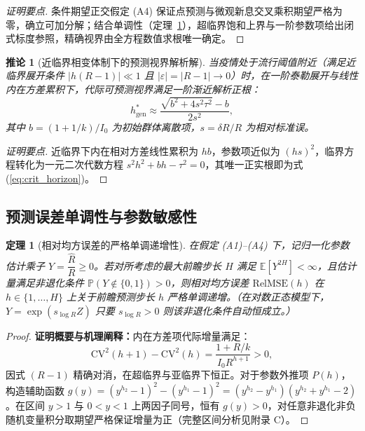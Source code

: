 \documentclass[11pt,a4paper]{article}
\theoremstyle{plain}
\newtheorem{theorem}{定理}
\newtheorem{corollary}{推论}
\theoremstyle{definition}
\begin{document}
\begin{proof}[证明要点]
条件期望正交假定 (A4) 保证点预测与微观新息交叉乘积期望严格为零，确立可加分解；结合单调性（定理~\ref{thm:monotonicity}），超临界饱和上界与一阶参数项给出闭式标度参照，精确视界由全方程数值求根唯一确定。
\end{proof}

\begin{corollary}[近临界相变体制下的预测视界解析解]\label{cor:near_crit_horizon}
当疫情处于流行阈值附近（满足近临界展开条件 $|h(R - 1)| \ll 1$ 且 $|\varepsilon| = |R - 1| \to 0$）时，在一阶泰勒展开与线性内在方差累积下，代际可预测视界满足一阶渐近解析正根：
\begin{equation}
h^*_{\text{gen}} \approx \frac{\sqrt{b^2 + 4 s^2 \tau^2} - b}{2 s^2},
\label{eq:crit_horizon}
\end{equation}
其中 $b = (1+1/k)/I_0$ 为初始群体离散项，$s = \delta R / R$ 为相对标准误。
\end{corollary}

\begin{proof}[证明要点]
近临界下内在相对方差线性累积为 $hb$，参数项近似为 $(hs)^2$，临界方程转化为一元二次代数方程 $s^2 h^2 + bh - \tau^2 = 0$，其唯一正实根即为式 (\ref{eq:crit_horizon})。
\end{proof}

\subsection{预测误差单调性与参数敏感性}

\begin{theorem}[相对均方误差的严格单调递增性]\label{thm:monotonicity}
在假定 (A1)--(A4) 下，记归一化参数估计乘子 $Y = \dfrac{\hat{R}}{R} \ge 0$。若对所考虑的最大前瞻步长 $H$ 满足 $\mathbb{E}[Y^{2H}] < \infty$，且估计量满足非退化条件 $\mathbb{P}(Y \notin \{0, 1\}) > 0$，则相对均方误差 $\text{RelMSE}(h)$ 在 $h \in \{1, \dots, H\}$ 上关于前瞻预测步长 $h$ 严格单调递增。（在对数正态模型下，$Y = \exp(s_{\log R} Z)$ 只要 $s_{\log R} > 0$ 则该非退化条件自动恒成立。）
\end{theorem}

\begin{proof}
\textbf{证明概要与机理阐释：}内在方差项代际增量满足：
\begin{equation*}
\text{CV}^2(h+1) - \text{CV}^2(h) = \frac{1+R/k}{I_0 R^{h+1}} > 0,
\end{equation*}
因式 $(R-1)$ 精确对消，在超临界与亚临界下恒正。对于参数外推项 $P(h)$，构造辅助函数 $g(y) = (y^{h_2}-1)^2 - (y^{h_1}-1)^2 = (y^{h_2}-y^{h_1})(y^{h_2}+y^{h_1}-2)$。在区间 $y>1$ 与 $0<y<1$ 上两因子同号，恒有 $g(y) > 0$，对任意非退化非负随机变量积分取期望严格保证增量为正（完整区间分析见附录 C）。
\end{proof}
\end{document}
